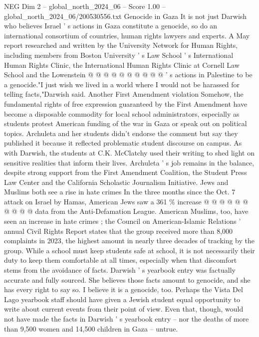\begin{textsample}{NEG Dim 2 – global\_north\_2024\_06 – Score 1.00 – global\_north\_2024\_06/200530556.txt}
Genocide in Gaza It is not just Darwish who believes Israel ' s actions in Gaza constitute a genocide, so do an international consortium of countries, human rights lawyers and experts.
A May report researched and written by the University Network for Human Rights, including members from Boston University ' s Law School ' s International Human Rights Clinic, the International Human Rights Clinic at Cornell Law School and the Lowenstein @ @ @ @ @ @ @ @ @ @ ' s actions in Palestine to be a genocide."I just wish we lived in a world where I would not be harassed for telling facts,"Darwish said.
Another First Amendment violation Somehow, the fundamental rights of free expression guaranteed by the First Amendment have become a disposable commodity for local school administrators, especially as students protest American funding of the war in Gaza or speak out on political topics.
Archuleta and her students didn't endorse the comment but say they published it because it reflected problematic student discourse on campus.
As with Darwish, the students at C.K.
McClatchy used their writing to shed light on sensitive realities that inform their lives.
Archuleta ' s job remains in the balance, despite strong support from the First Amendment Coalition, the Student Press Law Center and the California Scholastic Journalism Initiative.
Jews and Muslims both see a rise in hate crimes In the three months since the Oct. 7 attack on Israel by Hamas, American Jews saw a 361 \% increase @ @ @ @ @ @ @ @ @ @ data from the Anti-Defamation League.
American Muslims, too, have seen an increase in hate crimes ; the Council on American-Islamic Relations ' annual Civil Rights Report states that the group received more than 8,000 complaints in 2023, the highest amount in nearly three decades of tracking by the group.
While a school must keep students safe at school, it is not necessarily their duty to keep them comfortable at all times, especially when that discomfort stems from the avoidance of facts.
Darwish ' s yearbook entry was factually accurate and fully sourced.
She believes those facts amount to genocide, and she has every right to say so.
I believe it is a genocide, too.
Perhaps the Vista Del Lago yearbook staff should have given a Jewish student equal opportunity to write about current events from their point of view.
Even that, though, would not have made the facts in Darwish ' s yearbook entry -- nor the deaths of more than 9,500 women and 14,500 children in Gaza -- untrue.

\end{textsample}
